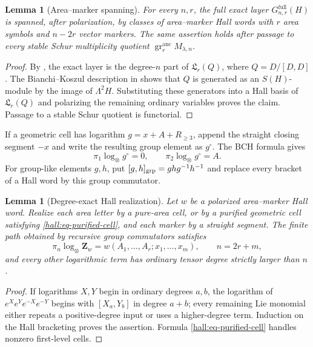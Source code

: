 \documentclass[10pt,reqno]{amsart}
\theoremstyle{plain}
\newtheorem{lemma}[theorem]{Lemma}
\theoremstyle{definition}
\theoremstyle{remark}
\begin{document}
\begin{lemma}[Area--marker spanning]
\label{hall:lem-area-marker-spanning}
For every $n,r$, the full exact layer
$G^{\mathrm{full}}_{n,r}(H)$ is spanned, after polarization, by classes of
area--marker Hall words with $r$ area symbols and $n-2r$ vector markers.
The same assertion holds after passage to every stable Schur multiplicity
quotient $\operatorname{gr}^{\mathrm{anc}}_rM_{\lambda,n}$.
\end{lemma}

\begin{proof}
By , the exact layer is the degree-$n$ part of
$\mathfrak L_r(Q)$, where $Q=D/[D,D]$.  The Bianchi--Koszul description in
 shows that $Q$ is generated as an $S(H)$-module
by the image of $\Lambda^2H$.  Substituting these generators into a Hall basis
of $\mathfrak L_r(Q)$ and polarizing the remaining ordinary variables proves
the claim.  Passage to a stable Schur quotient is functorial.
\end{proof}

If a geometric cell has logarithm
$g=x+A+R_{\ge3}$, append the straight closing segment $-x$ and write the
resulting group element as $g^\circ$.  The BCH formula gives
\begin{equation}
 \pi_1\log_\otimes g^\circ=0,
 \qquad
 \pi_2\log_\otimes g^\circ=A.
 \label{hall:eq-purified-cell}
\end{equation}
For group-like elements $g,h$, put
$[g,h]_{\rm grp}=ghg^{-1}h^{-1}$ and replace every bracket of a Hall word by
this group commutator.

\begin{lemma}[Degree-exact Hall realization]
\label{hall:lem-Hall-exact}
Let $w$ be a polarized area--marker Hall word.  Realize each area letter by a
pure-area cell, or by a purified geometric cell satisfying
\eqref{hall:eq-purified-cell}, and each marker by a straight segment.  The
finite path obtained by recursive group commutators satisfies
\begin{equation}
 \pi_n\log_\otimes\mathbf Z_w
 =w(A_1,\ldots,A_r;x_1,\ldots,x_m),
 \qquad n=2r+m,
 \label{hall:eq-Hall-leading}
\end{equation}
and every other logarithmic term has ordinary tensor degree strictly larger
than $n$.
\end{lemma}

\begin{proof}
If logarithms $X,Y$ begin in ordinary degrees $a,b$, the logarithm of
$e^Xe^Ye^{-X}e^{-Y}$ begins with $[X_a,Y_b]$ in degree $a+b$; every remaining
Lie monomial either repeats a positive-degree input or uses a higher-degree
term.  Induction on the Hall bracketing proves the assertion.  Formula
\eqref{hall:eq-purified-cell} handles nonzero first-level cells.
\end{proof}
\end{document}
